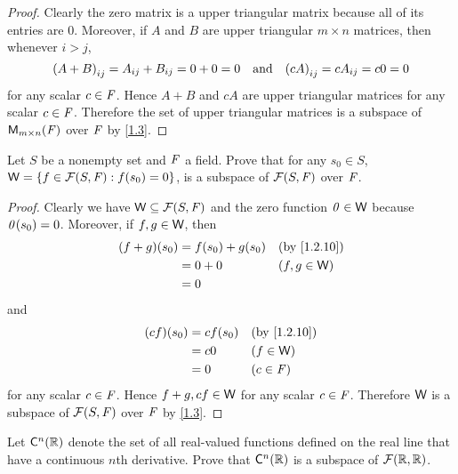 \begin{proof}
  Clearly the zero matrix is a upper triangular matrix because all of its entries are \(0\).
  Moreover, if \(A\) and \(B\) are upper triangular \(m \times n\) matrices, then whenever \(i > j\),
  \[
    \p{A + B}_{i j} = A_{i j} + B_{i j} = 0 + 0 = 0 \quad \text{and} \quad \p{cA}_{i j} = cA_{i j} = c0 = 0
  \]
  for any scalar \(c \in \mathit{F}\).
  Hence \(A + B\) and \(cA\) are upper triangular matrices for any scalar \(c \in \mathit{F}\).
  Therefore the set of upper triangular matrices is a subspace of \(\mathsf{M}_{{m} \times n}({\mathit{F}})\) over \(\mathit{F}\) by \cref{1.3}.
\end{proof}

\begin{ex}\label{ex:1.3.13}
  Let \(S\) be a nonempty set and \(\mathit{F}\) a field.
  Prove that for any \(s_{0} \in S\), \(\W = \set{f \in \FS : f\p{s_{0}} = 0}\), is a subspace of \(\FS\) over \(\mathit{F}\).
\end{ex}

\begin{proof}
  Clearly we have \(\W \subseteq \FS\) and the zero function \(\mathit{0} \in \mathsf{W}\) because \(\zv\p{s_{0}} = 0\).
  Moreover, if \(f, g \in \mathsf{W}\), then
  \begin{align*}
    \p{f + g}\p{s_{0}} & = f\p{s_{0}} + g\p{s_{0}} &  & \text{(by \cref{1.2.10})} \\
                       & = 0 + 0                   &  & (f, g \in \W)             \\
                       & = 0
  \end{align*}
  and
  \begin{align*}
    \p{cf}\p{s_{0}} & = cf\p{s_0} &  & \text{(by \cref{1.2.10})} \\
                    & = c0        &  & (f \in \W)                \\
                    & = 0         &  & (c \in \F)
  \end{align*}
  for any scalar \(c \in \mathit{F}\).
  Hence \(f + g, cf \in \mathsf{W}\) for any scalar \(c \in \mathit{F}\).
  Therefore \(\mathsf{W}\) is a subspace of \(\FS\) over \(\mathit{F}\) by \cref{1.3}.
\end{proof}

\setcounter{ex}{15}
\begin{ex}\label{ex:1.3.16}
  Let \(\cfs[n]{\R}\) denote the set of all real-valued functions defined on the real line that have a continuous \(n\)th derivative.
  Prove that \(\cfs[n]{\R}\) is a subspace of \(\fs{\R}{\R}\).
\end{ex}

